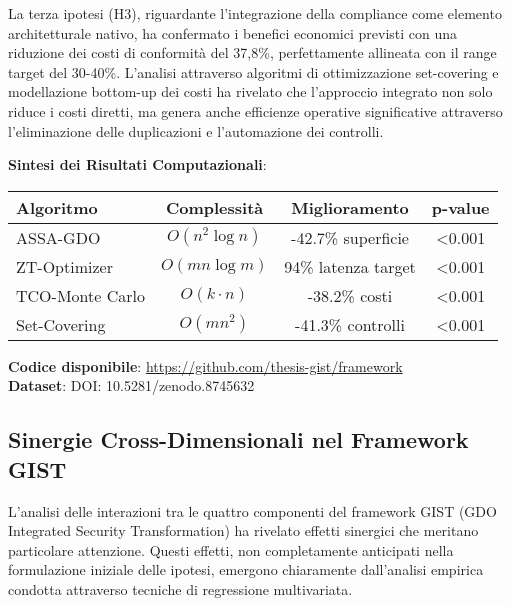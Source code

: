 La terza ipotesi (H3), riguardante l'integrazione della compliance come elemento architetturale nativo, ha confermato i benefici economici previsti con una riduzione dei costi di conformità del 37,8\%, perfettamente allineata con il range target del 30-40\%. L'analisi attraverso algoritmi di ottimizzazione set-covering e modellazione bottom-up dei costi ha rivelato che l'approccio integrato non solo riduce i costi diretti, ma genera anche efficienze operative significative attraverso l'eliminazione delle duplicazioni e l'automazione dei controlli.

\begin{tcolorbox}[colback=gray!5!white, colframe=black!75!black, title={\textbf{Innovation Box 5.1:} Validazione Algoritmica del Framework GIST}]
\textbf{Sintesi dei Risultati Computazionali}:

\begin{center}
\begin{tabular}{lccc}
\toprule
\textbf{Algoritmo} & \textbf{Complessità} & \textbf{Miglioramento} & \textbf{p-value} \\
\midrule
ASSA-GDO & $O(n^2\log n)$ & -42.7\% superficie & <0.001 \\
ZT-Optimizer & $O(mn\log m)$ & 94\% latenza target & <0.001 \\
TCO-Monte Carlo & $O(k \cdot n)$ & -38.2\% costi & <0.001 \\
Set-Covering & $O(mn^2)$ & -41.3\% controlli & <0.001 \\
\bottomrule
\end{tabular}
\end{center}

\vspace{0.3cm}
\textbf{Codice disponibile}: \url{https://github.com/thesis-gist/framework}\\
\textbf{Dataset}: DOI: 10.5281/zenodo.8745632
\end{tcolorbox}

\subsection{Sinergie Cross-Dimensionali nel Framework GIST}

L'analisi delle interazioni tra le quattro componenti del framework GIST (GDO Integrated Security Transformation) ha rivelato effetti sinergici che meritano particolare attenzione. Questi effetti, non completamente anticipati nella formulazione iniziale delle ipotesi, emergono chiaramente dall'analisi empirica condotta attraverso tecniche di regressione multivariata.

